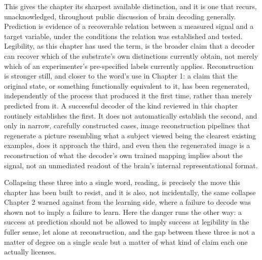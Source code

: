 \documentclass[11pt]{book}
\begin{document}
This gives the chapter its sharpest available distinction, and it is one that recurs, unacknowledged, throughout public discussion of brain decoding generally. Prediction is evidence of a recoverable relation between a measured signal and a target variable, under the conditions the relation was established and tested. Legibility, as this chapter has used the term, is the broader claim that a decoder can recover which of the substrate's own distinctions currently obtain, not merely which of an experimenter's pre-specified labels currently applies. Reconstruction is stronger still, and closer to the word's use in Chapter 1: a claim that the original state, or something functionally equivalent to it, has been regenerated, independently of the process that produced it the first time, rather than merely predicted from it. A successful decoder of the kind reviewed in this chapter routinely establishes the first. It does not automatically establish the second, and only in narrow, carefully constructed cases, image reconstruction pipelines that regenerate a picture resembling what a subject viewed being the clearest existing examples, does it approach the third, and even then the regenerated image is a reconstruction of what the decoder's own trained mapping implies about the signal, not an unmediated readout of the brain's internal representational format.

Collapsing these three into a single word, reading, is precisely the move this chapter has been built to resist, and it is also, not incidentally, the same collapse Chapter 2 warned against from the learning side, where a failure to decode was shown not to imply a failure to learn. Here the danger runs the other way: a success at prediction should not be allowed to imply success at legibility in the fuller sense, let alone at reconstruction, and the gap between these three is not a matter of degree on a single scale but a matter of what kind of claim each one actually licenses.
\end{document}
